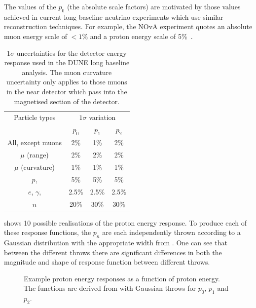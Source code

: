 The values of the $p_{0}$ (the absolute scale factors) are motivated by those values achieved in current long baseline neutrino experiments which use similar reconstruction techniques.
For example, the NOvA experiment quotes an absolute muon energy scale of $<1\%$ and a proton energy scale of 5\%~\cite{nova2018}.

\begin{table}
	\caption[$1\sigma$ uncertainties for the detector energy response used in the DUNE long baseline analysis]{$1\sigma$ uncertainties for the detector energy response used in the DUNE long baseline analysis. The muon curvature uncertainty only applies to those muons in the near detector which pass into the magnetised section of the detector.}
	\label{tab:energyScaleParams}
	\centering
	\begin{tabular}{c c c c}
		\hline
		\hline
		Particle types & \multicolumn{3}{c}{$1\sigma$ variation} \\
		& $p_{0}$ & $p_{1}$ & $p_{2}$ \\
		\hline
		All, except muons      & 2\%   & 1\%   & 2\%   \\
		$\mu$ (range)          & 2\%   & 2\%   & 2\%   \\
		$\mu$ (curvature)      & 1\%   & 1\%   & 1\%   \\
		$p$, \pipm             & 5\%   & 5\%   & 5\%   \\
		$e$, $\gamma$, \pizero & 2.5\% & 2.5\% & 2.5\% \\
		$n$                    & 20\%  & 30\%  & 30\% \\
		\hline
	\end{tabular}
\end{table}

 shows 10 possible realisations of the proton energy response.
To produce each of these response functions, the $p_{n}$ are each independently thrown according to a Gaussian distribution with the appropriate width from .
One can see that between the different throws there are significant differences in both the magnitude and shape of response function between different throws.

\begin{figure}[h]
	\begin{adjustbox}{max totalsize=.6\textwidth, center}
		
	\end{adjustbox}
	\caption[Example proton energy responses as a function of proton energy.]{Example proton energy responses as a function of proton energy. The functions are derived from  with Gaussian throws for $p_{0}$, $p_{1}$ and $p_{2}$.}
	\label{fig:protonEScale}
\end{figure}

